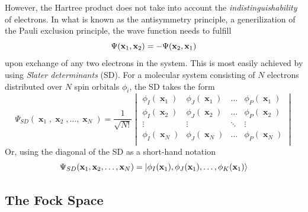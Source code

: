 However, the Hartree product does not take into account the \emph{indistinguishability} of electrons. In what is known as the antisymmetry principle, a generilization of the Pauli exclusion principle, the wave function needs to fulfill 
\begin{equation}
\Psi(\mathbf{x}_1,\mathbf{x}_2) = - \Psi(\mathbf{x}_2,\mathbf{x}_1) 
\end{equation}
\noindent upon exchange of any two electrons in the system. This is most easily achieved by using \emph{Slater determinants} (SD). For a molecular system consisting of $N$ electrons distributed over $N$ spin orbitals $\phi_i$, the SD takes the form
\begin{equation}
\Psi_{SD}(\mbfx_1, \mbfx_2, \ldots, \mbfx_N) = \frac{1}{\sqrt{N!}}
\begin{vmatrix}
\phi_I(\mbfx_1) & \phi_J(\mbfx_1) & \ldots & \phi_P(\mbfx_1) \\
\phi_I(\mbfx_2) & \phi_J(\mbfx_2) & \ldots & \phi_P(\mbfx_2) \\
\vdots & \vdots & \ddots & \vdots \\
\phi_I(\mbfx_N) & \phi_J(\mbfx_N) & \ldots & \phi_P(\mbfx_N) \\
\end{vmatrix}
\end{equation}
\noindent Or, using the diagonal of the SD as a short-hand notation
\begin{equation}
\Psi_{SD}(\mathbf{x}_1, \mathbf{x}_2, \ldots, \mathbf{x}_N) = \ket{\phi_I(\mathbf{x}_1) , \phi_J(\mathbf{x}_1), \ldots, \phi_K(\mathbf{x}_1)}
\end{equation}

\subsection{The Fock Space}

